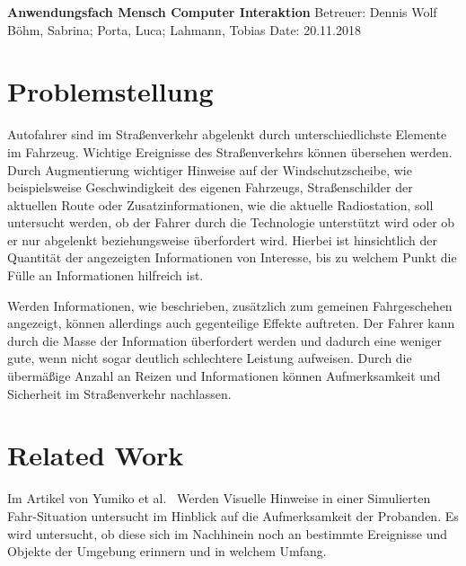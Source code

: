 \documentclass[a4paper, 11pt]{article}
\begin{document}
\noindent
\large\textbf{Anwendungsfach Mensch Computer Interaktion} \hfill Betreuer: Dennis Wolf \\
\normalsize Böhm, Sabrina; Porta, Luca; Lahmann, Tobias \hfill Date: 20.11.2018 \\


\section*{Problemstellung}
Autofahrer sind im Straßenverkehr abgelenkt durch unterschiedlichste Elemente im Fahrzeug. Wichtige Ereignisse des Straßenverkehrs können übersehen werden. Durch Augmentierung wichtiger Hinweise auf der Windschutzscheibe, wie beispielsweise Geschwindigkeit des eigenen Fahrzeugs, Straßenschilder der aktuellen Route oder Zusatzinformationen, wie die aktuelle Radiostation, soll untersucht werden, ob der Fahrer durch die Technologie unterstützt wird oder ob er nur abgelenkt beziehungsweise überfordert wird. Hierbei ist hinsichtlich der Quantität der angezeigten Informationen von Interesse, bis zu welchem Punkt die Fülle an Informationen hilfreich ist. 

Werden Informationen, wie beschrieben, zusätzlich zum gemeinen Fahrgeschehen angezeigt, können allerdings auch gegenteilige Effekte auftreten. Der Fahrer kann durch die Masse der Information überfordert werden und dadurch eine weniger gute, wenn nicht sogar deutlich schlechtere Leistung aufweisen. Durch die übermäßige Anzahl an Reizen und Informationen können Aufmerksamkeit und Sicherheit im Straßenverkehr nachlassen. 

\section*{Related Work}
Im Artikel von Yumiko et al.~\cite{VisAttention} Werden Visuelle Hinweise in einer Simulierten Fahr-Situation untersucht im Hinblick auf die Aufmerksamkeit der Probanden. Es wird untersucht, ob diese sich im Nachhinein noch an bestimmte Ereignisse und Objekte der Umgebung erinnern und in welchem Umfang.

\cite{seppelt2017attend, yeh2001cueReliability, chi05bonanni, murphyChutorian2010awareness}
\end{document}
